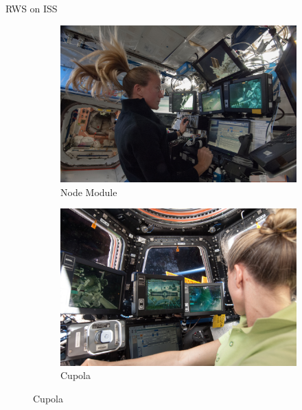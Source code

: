 \documentclass[10pt]{beamer}
\begin{document}
\begin{frame}[fragile]{RWS on ISS}
  \begin{figure}
    \begin{center}
      \begin{subfigure}{0.49\textwidth}
        \includegraphics[width=\linewidth]{../img/iss036e017589.JPG}
        \caption{Node Module}
      \end{subfigure}\hfill
      \begin{subfigure}{0.49\textwidth}
        \includegraphics[width=\linewidth]{../img/iss036e029229.JPG}
        \caption{Cupola}
      \end{subfigure}
    \end{center}
  \end{figure}
\end{frame}
\end{document}

